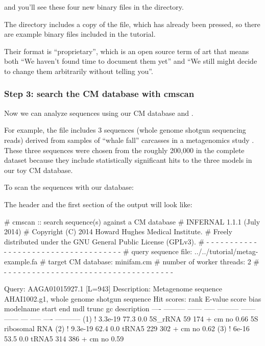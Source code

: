 and you'll see these four new binary files in the directory. 

The  directory includes a copy of the
 file, which has already been pressed, so there
are example binary files 
included in the tutorial.

Their format is ``proprietary'', which is an open source term of art
that means both ``We haven't found time to document them yet'' and ``We
still might decide to change them arbitrarily without telling you''.

\subsubsection{Step 3: search the CM database with cmscan}

Now we can analyze sequences using our CM database and
. 

For example, the file  includes 3
sequences (whole genome shotgun sequencing reads) derived from samples
of ``whale fall'' carcasses in a metagenomics study
\citep{Tringe05}. These three sequences were chosen from the roughly
200,000 in the complete dataset because they include statistically
significant hits to the three models in our toy CM database.

To scan the sequences with our database: 


The header and the first section of the output will look like:

\newpage

\begin{sreoutput}
# cmscan :: search sequence(s) against a CM database
# INFERNAL 1.1.1 (July 2014)
# Copyright (C) 2014 Howard Hughes Medical Institute.
# Freely distributed under the GNU General Public License (GPLv3).
# - - - - - - - - - - - - - - - - - - - - - - - - - - - - - - - - - - - -
# query sequence file:                   ../../tutorial/metag-example.fa
# target CM database:                    minifam.cm
# number of worker threads:              2
# - - - - - - - - - - - - - - - - - - - - - - - - - - - - - - - - - - - -

Query:       AAGA01015927.1  [L=943]
Description: Metagenome sequence AHAI1002.g1, whole genome shotgun sequence
Hit scores:
 rank     E-value  score  bias  modelname  start    end   mdl trunc   gc  description
 ----   --------- ------ -----  --------- ------ ------   --- ----- ----  -----------
  (1) !   3.3e-19   77.3   0.0  5S_rRNA       59    174 +  cm    no 0.66  5S ribosomal RNA
  (2) !   9.3e-19   62.4   0.0  tRNA5        229    302 +  cm    no 0.62  
  (3) !     6e-16   53.5   0.0  tRNA5        314    386 +  cm    no 0.59  
\end{sreoutput}

